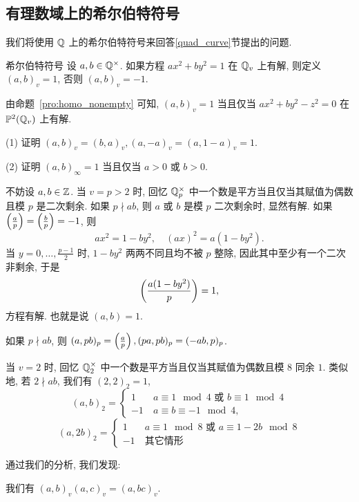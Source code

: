 \subsection{有理数域上的希尔伯特符号}
\label{2:hilbert_symbol}
我们将使用 ${\mathbb{Q}}$ 上的希尔伯特符号来回答\ref{quad_curve}节提出的问题.

\begin{definition}{希尔伯特符号}{}
设 $a,b\in{\mathbb{Q}}^\times$. 如果方程 $ax^2+by^2=1$ 在 ${\mathbb{Q}}_v$ 上有解, 则定义 $(a,b)_v=1$, 否则 $(a,b)_v=-1$.
\end{definition}

由命题~\ref{pro:homo_nonempty} 可知, $(a,b)_v=1$ 当且仅当 $ax^2+by^2-z^2=0$ 在 ${\mathbb{P}}^2({\mathbb{Q}}_v)$ 上有解. 

\begin{exercise}
(1) 证明 $(a,b)_v=(b,a)_v, (a,-a)_v=(a,1-a)_v=1$.

(2) 证明 $(a,b)_\infty=1$ 当且仅当 $a>0$ 或 $b>0$.
\end{exercise}

不妨设 $a,b\in{\mathbb{Z}}$. 当 $v=p>2$ 时, 回忆 ${\mathbb{Q}}_p^\times$ 中一个数是平方当且仅当其赋值为偶数且模 $p$ 是二次剩余. 如果 $p\nmid ab$, 则 $a$ 或 $b$ 是模 $p$ 二次剩余时, 显然有解. 如果 $\left(\frac{{a}}{p}\right)=\left(\frac{{b}}{p}\right)=-1$, 则
  \[ax^2=1-by^2,\quad (ax)^2=a(1-by^2).\]
当 $y=0,\dots,\frac{p-1}{2}$ 时, $1-by^2$ 两两不同且均不被 $p$ 整除, 因此其中至少有一个二次非剩余, 于是
\[\left(\frac{{a(1-by^2)}}{p}\right)=1,\]
方程有解. 也就是说 $(a,b)=1$.

\begin{exercise}
如果 $p\nmid ab$, 则 $(a,pb)_p=\left(\frac{{a}}{p}\right), (pa,pb)_p=(-ab,p)_p$.
\end{exercise}

当 $v=2$ 时, 回忆 ${\mathbb{Q}}_2^\times$ 中一个数是平方当且仅当其赋值为偶数且模 $8$ 同余 $1$. 类似地, 若 $2\nmid ab$, 我们有 $(2,2)_2=1$,
  \[(a,b)_2=\begin{cases}
1\quad &a\equiv 1\mod 4\text{ 或 } b\equiv 1\mod 4\\
-1 & a\equiv b\equiv -1\mod 4,
\end{cases}\]
  \[(a,2b)_2=\begin{cases}
1\quad &a\equiv 1\mod 8\text{ 或 } a\equiv 1-2b\mod 8\\
-1&\text{其它情形}
\end{cases}\]

通过我们的分析, 我们发现:
\begin{proposition}{}{}
我们有 $(a,b)_v(a,c)_v=(a,bc)_v$.
\end{proposition}

